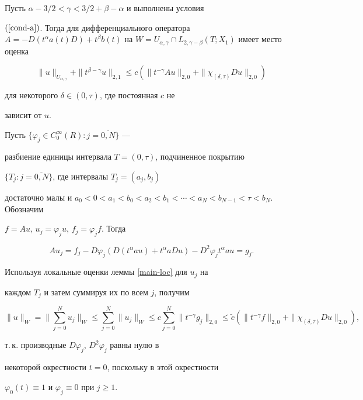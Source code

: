 \begin{thms}\label{main}


Пусть $\alpha-3/2 < \gamma < 3/2+\beta-\alpha$ и выполнены условия


$(\ref{cond-a})$. Тогда для дифференциального оператора $A


=-D(t^\alpha a(t) D) + t^\beta b(t)$ на $W=U_{\alpha,\gamma} \cap


L_{2,\gamma-\beta}(T;X_1)$ имеет место оценка


$$


\|u\|_{U_{\alpha,\gamma}}


+\|t^{\beta-\gamma} u\|_{2,1} \le c (\|t^{-\gamma}A u\|_{2,0}+


\|\chi_{(\delta,\tau)}D u\|_{2,0})


$$


для некоторого $\delta \in (0,\tau)$, где постоянная $c$ не


зависит от $u$.


\end{thms}





\begin{pf}


Пусть $\{\varphi_j \in C_0^\infty(R):j=\overline{0,N}\}$ ---


разбиение единицы интервала $T=(0,\tau)$, подчиненное покрытию


$\{T_j:j=\overline{0,N}\}$, где интервалы $T_j=(a_j,b_j)$


достаточно малы и $a_0 < 0 < a_1 <


b_0 < a_2 < b_1 < \dotsb < a_N < b_{N-1} < \tau < b_N$. Обозначим


$f =A u$, $u_j=\varphi_j u$, $f_j=\varphi_j f$. Тогда


$$


A u_j = f_j - D\varphi_j(D(t^\alpha a u)+t^\alpha a D u) - D^2


\varphi_j t^\alpha a u=g_j.


$$


Используя локальные оценки леммы \ref{main-loc} для $u_j$ на


каждом $T_j$ и затем суммируя их по всем $j$, получим


$$


\|u\|_W=\bigg\|\sum_{j=0}^N u_j\bigg\|_W \le


\sum_{j=0}^N \|u_j\|_W \le c \sum_{j=0}^N


\|t^{-\gamma}g_j\|_{2,0} \le \widetilde{c} (\|t^{-\gamma}f\|_{2,0}+


\|\chi_{(\delta,\tau)}D u\|_{2,0}),


$$


т.\,к. производные $D\varphi_j$, $D^2 \varphi_j$ равны нулю в


некоторой окрестности $t=0$, поскольку в этой окрестности


$\varphi_0(t) \equiv 1$ и $\varphi_j \equiv 0$ при $j \ge 1$.


\end{pf}





